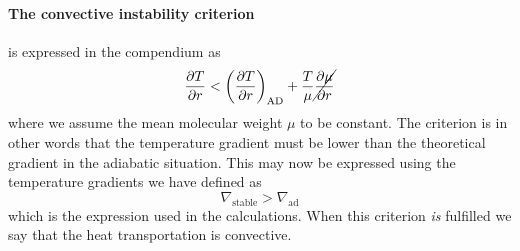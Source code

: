\documentclass[11pt,a4paper,twocolumn,titlepage]{article}
\newcommand{\nablastb}
{
\nabla_{\text{stable}}
}
\newcommand{\nablaad}
{
\nabla_{\text{ad}}
}
\begin{document}
\paragraph{The convective instability criterion} is expressed in the compendium as
\begin{equation*}
\pdv{T}{r} < \qty(\pdv{T}{r})_\text{AD} + \frac{T}{\mu}\cancel{\pdv{\mu}{r}}
\end{equation*}
where we assume the mean molecular weight $\mu$ to be constant. The criterion is in other words that the temperature gradient must be lower than the theoretical gradient in the adiabatic situation. This may now be expressed using the temperature gradients we have defined as
\begin{equation}
\nablastb > \nablaad \label{eq:Convective_criterion}
\end{equation}
which is the expression used in the calculations. When this criterion \textit{is} fulfilled we say that the heat transportation is convective.
\end{document}
